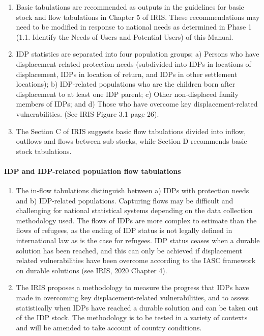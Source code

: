 \documentclass[
]{article}
\begin{document}
\begin{enumerate}
\def\labelenumi{\arabic{enumi}.}
\setcounter{enumi}{63}
\item
  Basic tabulations are recommended as outputs in the guidelines for
  basic stock and flow tabulations in Chapter 5 of IRIS. These
  recommendations may need to be modified in response to national
  needs as determined in Phase 1 (1.1. Identify the Needs of Users and
  Potential Users) of this Manual.
\item
  IDP statistics are separated into four population groups; a) Persons
  who have displacement-related protection needs (subdivided into IDPs
  in locations of displacement, IDPs in location of return, and IDPs
  in other settlement locations); b) IDP-related populations who are
  the children born after displacement to at least one IDP parent; c)
  Other non-displaced family members of IDPs; and d) Those who have
  overcome key displacement-related vulnerabilities. (See IRIS Figure
  3.1 page 26).
\item
  The Section C of IRIS suggests basic flow tabulations divided into
  inflow, outflows and flows between sub-stocks, while Section D
  recommends basic stock tabulations.
\end{enumerate}

\hypertarget{idp-and-idp-related-population-flow-tabulations-1}{%
\paragraph{IDP and IDP-related population flow tabulations}\label{idp-and-idp-related-population-flow-tabulations-1}}

\begin{enumerate}
\def\labelenumi{\arabic{enumi}.}
\setcounter{enumi}{66}
\item
  The in-flow tabulations distinguish between a) IDPs with protection
  needs and b) IDP-related populations. Capturing flows may be
  difficult and challenging for national statistical systems depending
  on the data collection methodology used. The flows of IDPs are more
  complex to estimate than the flows of refugees, as the ending of IDP
  status is not legally defined in international law as is the case
  for refugees. IDP status ceases when a durable solution has been
  reached, and this can only be achieved if displacement related
  vulnerabilities have been overcome according to the IASC framework
  on durable solutions (see IRIS, 2020 Chapter 4).
\item
  The IRIS proposes a methodology to measure the progress that IDPs
  have made in overcoming key displacement-related vulnerabilities,
  and to assess statistically when IDPs have reached a durable
  solution and can be taken out of the IDP stock. The methodology is
  to be tested in a variety of contexts and will be amended to take
  account of country conditions.
\end{enumerate}
\end{document}
